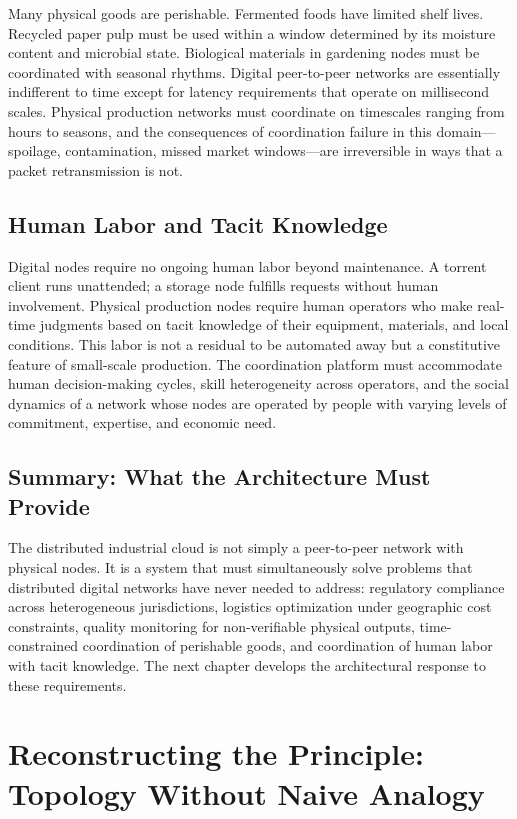 \documentclass[12pt]{book}
\theoremstyle{definition}
\theoremstyle{remark}
\begin{document}
Many physical goods are perishable. Fermented foods have limited
shelf lives. Recycled paper pulp must be used within a window
determined by its moisture content and microbial state. Biological
materials in gardening nodes must be coordinated with seasonal
rhythms. Digital peer-to-peer networks are essentially indifferent
to time except for latency requirements that operate on millisecond
scales. Physical production networks must coordinate on timescales
ranging from hours to seasons, and the consequences of coordination
failure in this domain---spoilage, contamination, missed
market windows---are irreversible in ways that a packet retransmission
is not.

\section{Human Labor and Tacit Knowledge}

Digital nodes require no ongoing human labor beyond maintenance. A
torrent client runs unattended; a storage node fulfills requests
without human involvement. Physical production nodes require human
operators who make real-time judgments based on tacit knowledge of
their equipment, materials, and local conditions. This labor is not
a residual to be automated away but a constitutive feature of
small-scale production. The coordination platform must accommodate
human decision-making cycles, skill heterogeneity across operators,
and the social dynamics of a network whose nodes are operated by
people with varying levels of commitment, expertise, and economic
need.

\section{Summary: What the Architecture Must Provide}

The distributed industrial cloud is not simply a peer-to-peer
network with physical nodes. It is a system that must simultaneously
solve problems that distributed digital networks have never needed to
address: regulatory compliance across heterogeneous jurisdictions,
logistics optimization under geographic cost constraints, quality
monitoring for non-verifiable physical outputs, time-constrained
coordination of perishable goods, and coordination of human labor
with tacit knowledge. The next chapter develops the architectural
response to these requirements.

\chapter{Reconstructing the Principle: Topology Without Naive Analogy}
\end{document}
